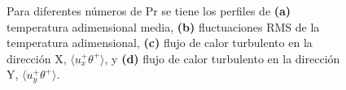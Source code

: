 \begin{figure}[H]
 \centering
 
 \caption{Para diferentes números de Pr se tiene los perfiles de \textbf{(a)} temperatura adimensional media, \textbf{(b)} fluctuaciones RMS de la temperatura adimensional, \textbf{(c)} flujo de calor turbulento en la dirección X, $\langle u^+_x \theta^+ \rangle$, y \textbf{(d)} flujo de calor turbulento en la dirección Y, $\langle u^+_y \theta^+ \rangle$.} 
 \label{fig:kpr_1}
\end{figure}


